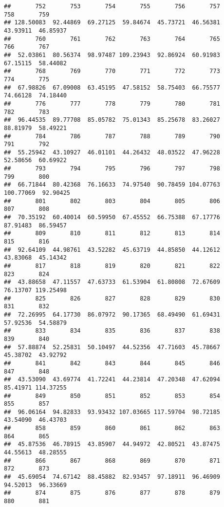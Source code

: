 \documentclass[
]{article}
\begin{document}
\begin{verbatim}
##       752       753       754       755       756       757       758       759 
## 128.50083  92.44869  69.27125  59.84674  45.73721  46.56381  43.93911  46.85937 
##       760       761       762       763       764       765       766       767 
##  52.03861  80.56374  98.97487 109.23943  92.86924  60.91983  67.15115  58.44082 
##       768       769       770       771       772       773       774       775 
##  67.98826  67.09008  63.45195  47.58152  58.75403  66.75577  74.66128  74.18440 
##       776       777       778       779       780       781       782       783 
##  96.44535  89.77708  85.05782  75.01343  85.25678  83.26027  88.81979  58.49221 
##       784       786       787       788       789       790       791       792 
##  55.25942  43.10927  46.01101  44.26432  48.03522  47.96228  52.58656  60.69922 
##       793       794       795       796       797       798       799       800 
##  66.71844  80.42368  76.16633  74.97540  90.78459 104.07763 100.77069  92.90425 
##       801       802       803       804       805       806       807       808 
##  70.35192  60.40014  60.59950  67.45552  66.75388  67.17776  87.91483  86.59457 
##       809       810       811       812       813       814       815       816 
##  92.64109  44.98761  43.52282  45.63719  44.85850  44.12612  43.83068  45.14342 
##       817       818       819       820       821       822       823       824 
##  43.88658  47.11557  47.63733  61.53904  61.80808  72.67609  76.13707 119.25498 
##       825       826       827       828       829       830       831       832 
##  72.26995  64.17730  86.07972  90.17365  68.49490  61.69431  57.92536  54.58879 
##       833       834       835       836       837       838       839       840 
##  57.88874  52.25831  50.10497  44.52356  47.71603  45.78667  45.38702  43.92792 
##       841       842       843       844       845       846       847       848 
##  43.53090  43.69774  41.72241  44.23814  47.20348  47.62094  85.41971 114.37255 
##       849       850       851       852       853       854       855       857 
##  96.06164  94.82833  93.93432 107.03665 117.59704  98.72185  43.54090  46.43703 
##       858       859       860       861       862       863       864       865 
##  45.87536  46.78915  43.85907  44.94972  42.80521  43.87475  44.55613  48.28555 
##       866       867       868       869       870       871       872       873 
##  45.69054  74.67142  88.45882  82.93457  97.18911  96.46909  94.52013  96.33669 
##       874       875       876       877       878       879       880       881 

\end{verbatim}
\end{document}
